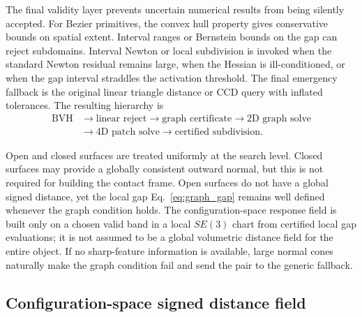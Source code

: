 \documentclass[preprint,12pt]{elsarticle}
\begin{document}
The final validity layer prevents uncertain numerical results from being silently accepted. For Bezier primitives, the convex hull property gives conservative bounds on spatial extent. Interval ranges or Bernstein bounds on the gap can reject subdomains. Interval Newton or local subdivision is invoked when the standard Newton residual remains large, when the Hessian is ill-conditioned, or when the gap interval straddles the activation threshold. The final emergency fallback is the original linear triangle distance or CCD query with inflated tolerances. The resulting hierarchy is
\begin{equation}
    \begin{aligned}
    \text{BVH} &\rightarrow \text{linear reject}
    \rightarrow \text{graph certificate}
    \rightarrow \text{2D graph solve} \\
    &\rightarrow \text{4D patch solve}
    \rightarrow \text{certified subdivision}.
    \end{aligned}
\end{equation}

Open and closed surfaces are treated uniformly at the search level. Closed surfaces may provide a globally consistent outward normal, but this is not required for building the contact frame. Open surfaces do not have a global signed distance, yet the local gap Eq.~\eqref{eq:graph_gap} remains well defined whenever the graph condition holds. The configuration-space response field is built only on a chosen valid band in a local $SE(3)$ chart from certified local gap evaluations; it is not assumed to be a global volumetric distance field for the entire object. If no sharp-feature information is available, large normal cones naturally make the graph condition fail and send the pair to the generic fallback.

\subsection{Configuration-space signed distance field}
\label{subsec:sdf_refinement}
\end{document}
